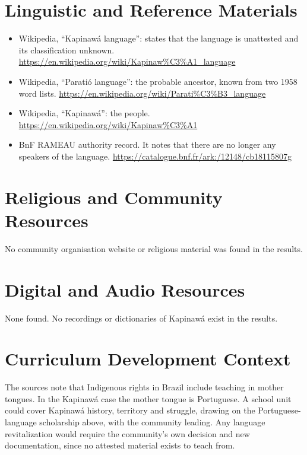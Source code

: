\documentclass[12pt]{article}
\begin{document}
\section{Linguistic and Reference Materials}
\begin{itemize}
\item Wikipedia, ``Kapinaw\'a language'': states that the language is unattested and its classification unknown. \url{https://en.wikipedia.org/wiki/Kapinaw%C3%A1_language}
\item Wikipedia, ``Parati\'o language'': the probable ancestor, known from two 1958 word lists. \url{https://en.wikipedia.org/wiki/Parati%C3%B3_language}
\item Wikipedia, ``Kapinaw\'a'': the people. \url{https://en.wikipedia.org/wiki/Kapinaw%C3%A1}
\item BnF RAMEAU authority record. It notes that there are no longer any speakers of the language. \url{https://catalogue.bnf.fr/ark:/12148/cb18115807g}
\end{itemize}

\section{Religious and Community Resources}
No community organisation website or religious material was found in the results.

\section{Digital and Audio Resources}
None found. No recordings or dictionaries of Kapinaw\'a exist in the results.

\section{Curriculum Development Context}
The sources note that Indigenous rights in Brazil include teaching in mother tongues. In the Kapinaw\'a case the mother tongue is Portuguese. A school unit could cover Kapinaw\'a history, territory and struggle, drawing on the Portuguese-language scholarship above, with the community leading. Any language revitalization would require the community's own decision and new documentation, since no attested material exists to teach from.
\end{document}

